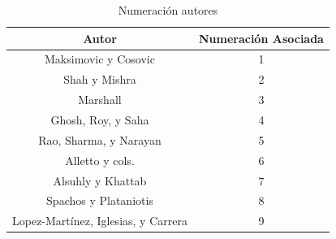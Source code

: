    \begin{table}[H]
        \centering
        \caption{Numeración autores}
        \begin{tabular}{|c|c|}
        \hline
        \rowcolor[HTML]{9698ED} 
        Autor & Numeración Asociada \\ \hline
        Maksimovic y Cosovic \cite{maksimovic}     & 1                   \\ \hline
        Shah y Mishra \cite{shan}     & 2                                \\ \hline
        Marshall \cite{marshall}     & 3                                 \\ \hline
        Ghosh, Roy, y Saha \cite{ghosh}     & 4                          \\ \hline
        Rao, Sharma, y Narayan \cite{rao}     & 5                        \\ \hline
        Alletto y cols. \cite{alletto}     & 6                           \\ \hline
        Alsuhly y Khattab \cite{alsuhly}     & 7                         \\ \hline
        Spachos y Plataniotis \cite{spachos}     & 8                     \\ \hline
        Lopez-Martínez, Iglesias, y Carrera \cite{lopezmartinez}     & 9\\ \hline
        \end{tabular}
        \label{tab:numeracion_autores}
    \end{table}

